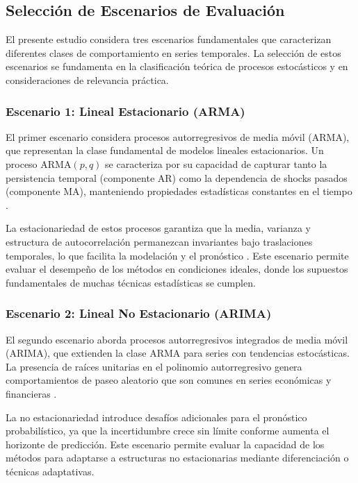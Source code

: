 \subsection{Selección de Escenarios de Evaluación}
\label{subsec:escenarios}

El presente estudio considera tres escenarios fundamentales que caracterizan diferentes clases de comportamiento en series temporales. La selección de estos escenarios se fundamenta en la clasificación teórica de procesos estocásticos y en consideraciones de relevancia práctica.

\subsubsection{Escenario 1: Lineal Estacionario (ARMA)}

El primer escenario considera procesos autorregresivos de media móvil (ARMA), que representan la clase fundamental de modelos lineales estacionarios. Un proceso ARMA$(p,q)$ se caracteriza por su capacidad de capturar tanto la persistencia temporal (componente AR) como la dependencia de shocks pasados (componente MA), manteniendo propiedades estadísticas constantes en el tiempo \parencite{Arrieta2017}.

La estacionariedad de estos procesos garantiza que la media, varianza y estructura de autocorrelación permanezcan invariantes bajo traslaciones temporales, lo que facilita la modelación y el pronóstico \parencite{Hyndman2021FPP3}. Este escenario permite evaluar el desempeño de los métodos en condiciones ideales, donde los supuestos fundamentales de muchas técnicas estadísticas se cumplen.

\subsubsection{Escenario 2: Lineal No Estacionario (ARIMA)}

El segundo escenario aborda procesos autorregresivos integrados de media móvil (ARIMA), que extienden la clase ARMA para series con tendencias estocásticas. La presencia de raíces unitarias en el polinomio autorregresivo genera comportamientos de paseo aleatorio que son comunes en series económicas y financieras \parencite{Hyndman2021FPP3}.

La no estacionariedad introduce desafíos adicionales para el pronóstico probabilístico, ya que la incertidumbre crece sin límite conforme aumenta el horizonte de predicción. Este escenario permite evaluar la capacidad de los métodos para adaptarse a estructuras no estacionarias mediante diferenciación o técnicas adaptativas.

